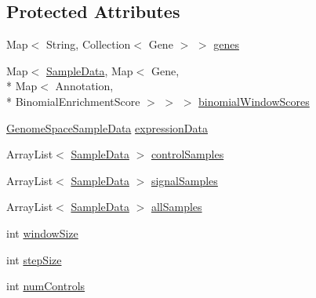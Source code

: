 \subsection*{Protected Attributes}
\begin{DoxyCompactItemize}
\item 
Map$<$ String, Collection$<$ Gene $>$ $>$ \hyperlink{classbroad_1_1pda_1_1seq_1_1protection_1_1_multi_sample_scan_peak_caller_a3ec4b745c679b9c175b6b1fb43100f09}{genes}
\item 
Map$<$ \hyperlink{classbroad_1_1pda_1_1seq_1_1protection_1_1_sample_data}{Sample\+Data}, Map$<$ Gene, \\*
Map$<$ Annotation, \\*
Binomial\+Enrichment\+Score $>$ $>$ $>$ \hyperlink{classbroad_1_1pda_1_1seq_1_1protection_1_1_multi_sample_scan_peak_caller_a287d7b53202216bf59085f239aca6f72}{binomial\+Window\+Scores}
\item 
\hyperlink{classbroad_1_1pda_1_1seq_1_1protection_1_1_genome_space_sample_data}{Genome\+Space\+Sample\+Data} \hyperlink{classbroad_1_1pda_1_1seq_1_1protection_1_1_multi_sample_scan_peak_caller_a4656b0f04b612595ef9717a3edf4f4c0}{expression\+Data}
\item 
Array\+List$<$ \hyperlink{classbroad_1_1pda_1_1seq_1_1protection_1_1_sample_data}{Sample\+Data} $>$ \hyperlink{classbroad_1_1pda_1_1seq_1_1protection_1_1_multi_sample_scan_peak_caller_aa8b0b700ab5285893b7c7d7bc0710941}{control\+Samples}
\item 
Array\+List$<$ \hyperlink{classbroad_1_1pda_1_1seq_1_1protection_1_1_sample_data}{Sample\+Data} $>$ \hyperlink{classbroad_1_1pda_1_1seq_1_1protection_1_1_multi_sample_scan_peak_caller_ade4081e64c55bb4a96905b3a5d0926f2}{signal\+Samples}
\item 
Array\+List$<$ \hyperlink{classbroad_1_1pda_1_1seq_1_1protection_1_1_sample_data}{Sample\+Data} $>$ \hyperlink{classbroad_1_1pda_1_1seq_1_1protection_1_1_multi_sample_scan_peak_caller_aa49da0aefa4bfde3134955e4b542dc3f}{all\+Samples}
\item 
int \hyperlink{classbroad_1_1pda_1_1seq_1_1protection_1_1_multi_sample_scan_peak_caller_a0c59f72373adab957b0055903341dd61}{window\+Size}
\item 
int \hyperlink{classbroad_1_1pda_1_1seq_1_1protection_1_1_multi_sample_scan_peak_caller_a7f46117f3c95d5ed4ae816db5807547d}{step\+Size}
\item 
int \hyperlink{classbroad_1_1pda_1_1seq_1_1protection_1_1_multi_sample_scan_peak_caller_a10171a68b040dff9fdb9292d739d6c76}{num\+Controls}

\end{DoxyCompactItemize}

